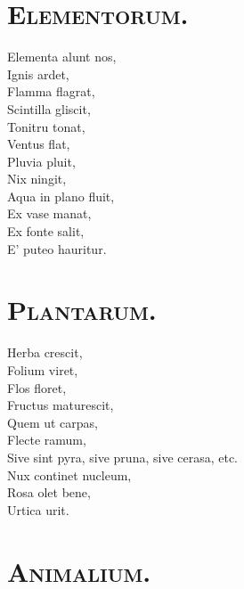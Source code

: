 \documentclass[12pt, twocolumn]{memoir}
\begin{document}
\section*{\textsc{Elementorum.}}

Elementa alunt nos,\\
Ignis ardet,\\
Flamma flagrat,\\
Scintilla gliscit,\\
Tonitru tonat,\\
Ventus flat,\\
Pluvia pluit,\\
Nix ningit,\\
Aqua in plano fluit,\\
Ex vase manat,\\
Ex fonte salit,\\
E' puteo hauritur.\\

\section*{\textsc{Plantarum.}}

Herba crescit,\\
Folium viret,\\
Flos floret,\\
Fructus maturescit,\\
Quem ut carpas,\\
Flecte ramum,\\
Sive sint pyra, sive pruna, sive cerasa, etc.\\
Nux continet nucleum,\\
Rosa olet bene,\\
Urtica urit.\\

\section*{\textsc{Animalium.}}
\end{document}
